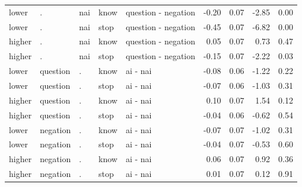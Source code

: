 \documentclass{article}
\begin{document}
\begin{tabular}{lllllrrrr}
  lower & . & nai & know & question - negation & -0.20 & 0.07 & -2.85 & 0.00 \\ 
  lower & . & nai & stop & question - negation & -0.45 & 0.07 & -6.82 & 0.00 \\ 
  higher & . & nai & know & question - negation & 0.05 & 0.07 & 0.73 & 0.47 \\ 
  higher & . & nai & stop & question - negation & -0.15 & 0.07 & -2.22 & 0.03 \\ 
  lower & question & . & know & ai - nai & -0.08 & 0.06 & -1.22 & 0.22 \\ 
  lower & question & . & stop & ai - nai & -0.07 & 0.06 & -1.03 & 0.31 \\ 
  higher & question & . & know & ai - nai & 0.10 & 0.07 & 1.54 & 0.12 \\ 
  higher & question & . & stop & ai - nai & -0.04 & 0.06 & -0.62 & 0.54 \\ 
  lower & negation & . & know & ai - nai & -0.07 & 0.07 & -1.02 & 0.31 \\ 
  lower & negation & . & stop & ai - nai & -0.04 & 0.07 & -0.53 & 0.60 \\ 
  higher & negation & . & know & ai - nai & 0.06 & 0.07 & 0.92 & 0.36 \\ 
  higher & negation & . & stop & ai - nai & 0.01 & 0.07 & 0.12 & 0.91 \\ 
   \hline
\end{tabular}
\end{document}
